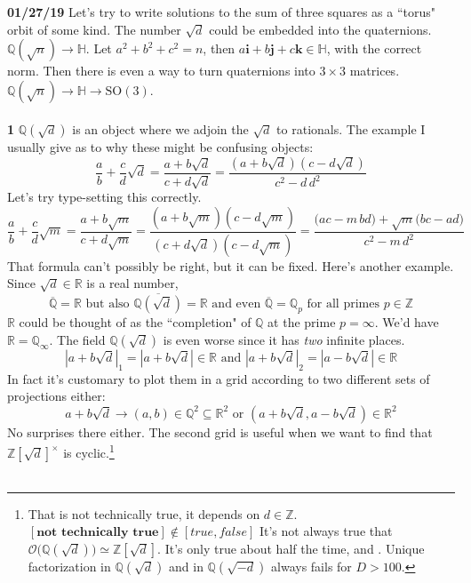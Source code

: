 \documentclass[12pt]{article}
\begin{document}
\newpage

\noindent \textbf{01/27/19} Let's try to write solutions to the sum of three squares as a ``torus" orbit of some kind.  The number $\sqrt{d}$ could be embedded into the quaternions.  $ \mathbb{Q}(\sqrt{n}) \to \mathbb{H}$. Let $a^2 + b^2 + c^2 = n$, then $a \mathbf{i} + b \mathbf{j} + c \mathbf{k} \in \mathbb{H} $, with the correct norm.  Then there is even a way to turn quaternions into $3 \times 3$ matrices.  $\mathbb{Q}(\sqrt{n}) \to \mathbb{H} \to \text{SO}(3)$.   \\ \\
\textbf{1} $\mathbb{Q}(\sqrt{d})$ is an object where we adjoin the $\sqrt{d}$ to rationals.  The example I usually give as to why these might be confusing objects:
$$  \frac{a}{b} + \frac{c}{d} \sqrt{d} = \frac{a + b \sqrt{d}}{c + d \sqrt{d}} = \frac{(a+b\sqrt{d})(c - d \sqrt{d})}{c^2 - d \, d^2}$$
Let's try type-setting this correctly.
$$  \frac{a}{b} + \frac{c}{d} \sqrt{m} = \frac{a + b \sqrt{m}}{c + d \sqrt{m}} 
= \frac{(a+b\sqrt{m})(c - d \sqrt{m})}{(c+d \sqrt{d})(c - d\sqrt{m})}
= \frac{ \big(ac- m\, bd\big) + \sqrt{m}\big(bc - ad \big)}{c^2 - m \, d^2}$$
That formula can't possibly be right, but it can be fixed.  Here's another example.  Since $\sqrt{d} \in \mathbb{R}$ is a real number, 
$$ \overline{\mathbb{Q}} = \mathbb{R} \text{ but also } \overline{\mathbb{Q}(\sqrt{d})}= \mathbb{R} \text{ and even } \overline{\mathbb{Q}} = \mathbb{Q}_p \text{ for all primes }p \in \mathbb{Z} $$
$\mathbb{R}$ could be thought of as the ``completion" of $\mathbb{Q}$ at the prime $p = \infty$.  We'd have $\mathbb{R} = \mathbb{Q}_\infty$.  The field $\mathbb{Q}(\sqrt{d})$ is even worse since it has \textit{two} infinite places.
$$ |a+b\sqrt{d}|_1 = |a + b \sqrt{d}| \in \mathbb{R} \text{ and }|a+b\sqrt{d}|_2 = |a - b \sqrt{d}| \in \mathbb{R} $$
In fact it's customary to plot them in a grid according to two different sets of projections either:
$$ a + b\sqrt{d} \to (a,b) \in \mathbb{Q}^2 \subseteq \mathbb{R}^2 \text{ or }(a + b \sqrt{d}, a - b \sqrt{d}) \in \mathbb{R}^2 $$
No surprises there either. The second grid is useful when we want to find that $\mathbb{Z}[\sqrt{d}]^\times$ is cyclic.\footnote{That is not technically true, it depends on $d \in \mathbb{Z}$. $[\textbf{not technically true}] \notin [true, false]$ It's not always true that $\mathcal{O}\big( \mathbb{Q}(\sqrt{d})\big) \simeq \mathbb{Z}[\sqrt{d}]$.  It's only true about half the time, and .  Unique factorization in $\mathbb{Q}(\sqrt{d})$ and in $\mathbb{Q}(\sqrt{-d})$ always fails for $D > 100$. } \\ \\
\end{document}
